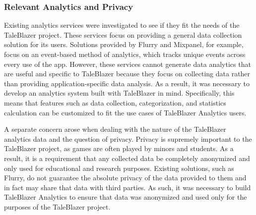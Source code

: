 \subsubsection{Relevant Analytics and Privacy}

Existing analytics services were investigated to see if they fit the needs of the TaleBlazer project. These services focus on providing a general data collection solution for its users. Solutions provided by Flurry and Mixpanel, for example, focus on an event-based method of analytics, which tracks unique events across every use of the app. However, these services cannot generate data analytics that are useful and specific to TaleBlazer because they focus on collecting data rather than providing application-specific data analysis. As a result, it was necessary to develop an analytics system built with TaleBlazer in mind. Specifically, this means that features such as data collection, categorization, and statistics calculation can be customized to fit the use cases of TaleBlazer Analytics users. 

A separate concern arose when dealing with the nature of the TaleBlazer analytics data and the question of privacy. Privacy is supremely important to the TaleBlazer project, as games are often played by minors and students. As a result, it is a requirement that any collected data be completely anonymized and only used for educational and research purposes. Existing solutions, such as Flurry, do not guarantee the absolute privacy of the data provided to them and in fact may share that data with third parties. \cite{site:flurry} As such, it was necessary to build TaleBlazer Analytics to ensure that data was anonymized and used only for the purposes of the TaleBlazer project. 





















